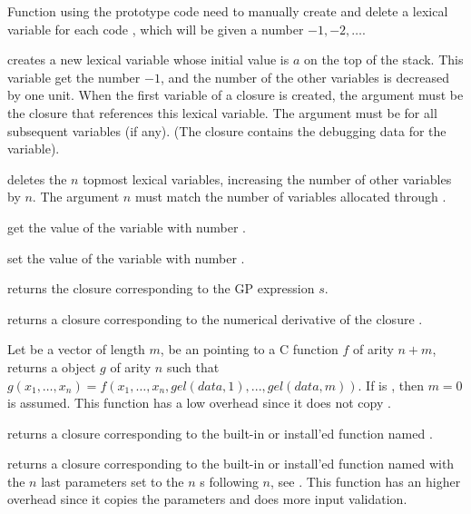 Function using the prototype code  need to manually create and delete a
lexical variable for each code , which will be given a number $-1, -2,
\ldots$.

 creates a new lexical variable whose
initial value is $a$ on the top of the stack. This variable get the number
$-1$, and the number of the other variables is decreased by one unit. When
the first variable of a closure is created, the argument  must be the
closure that references this lexical variable. The argument  must be
 for all subsequent variables (if any).  (The closure contains the
debugging data for the variable).

 deletes the $n$ topmost lexical variables,
increasing the number of other variables by $n$. The argument $n$ must match
the number of variables allocated through .

 get the value of the variable with number .

 set the value of the variable with number
.


 returns the closure corresponding to the
GP expression $s$.

 returns a closure corresponding to the
numerical derivative of the closure .

Let  be a vector of length $m$,  be an 
pointing to a C function $f$ of arity $n+m$, returns a  object
$g$ of arity $n$ such that
$g(x_1,\ldots,x_n)=f(x_1,\ldots,x_n,gel(data,1),...,gel(data,m))$. If
 is , then $m=0$ is assumed.  This function has a low
overhead since it does not copy .

 returns a closure corresponding to the
built-in or install'ed function named .

 returns a closure
corresponding to the built-in or install'ed function named  with the
$n$ last parameters set to the $n$ s following $n$, see
. This function has an higher overhead since it copies the
parameters and does more input validation.

